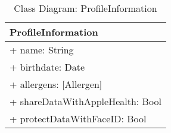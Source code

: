 \begin{table}[ht]
\centering
\caption{Class Diagram: ProfileInformation}

\hspace{1em}
\renewcommand{\arraystretch}{1.7}

\begin{tabular}{|l|}
\hline
\textbf{ProfileInformation} \\
\hline
+ name: String \\
+ birthdate: Date \\
+ allergens: [Allergen] \\
+ shareDataWithAppleHealth: Bool \\
+ protectDataWithFaceID: Bool \\
\hline
\end{tabular}
\end{table}
